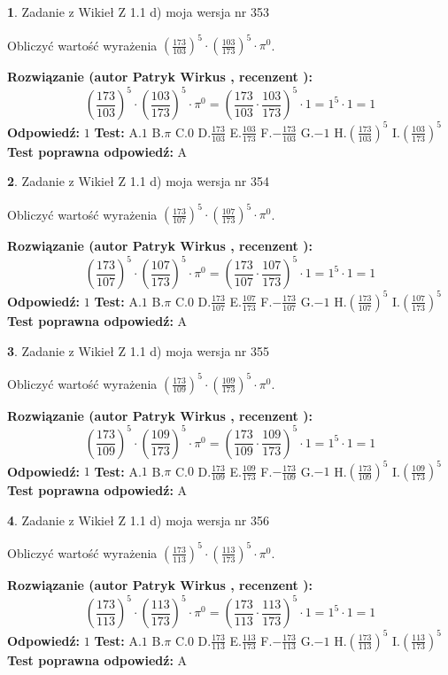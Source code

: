 \documentclass[12pt, a4paper]{article}
\theoremstyle{definition} %
\newtheorem{zad}{}
\newcommand{\zadStart}[1]{\begin{zad}#1\newline}
\newcommand{\zadStop}{\end{zad}}
\newcommand{\rozwStart}[2]{\noindent \textbf{Rozwiązanie (autor #1 , recenzent #2): }\newline}
\newcommand{\rozwStop}{\newline}
\newcommand{\odpStart}{\noindent \textbf{Odpowiedź:}\newline}
\newcommand{\odpStop}{\newline}
\newcommand{\testStart}{\noindent \textbf{Test:}\newline}
\newcommand{\testStop}{\newline}
\newcommand{\kluczStart}{\noindent \textbf{Test poprawna odpowiedź:}\newline}
\newcommand{\kluczStop}{\newline}
\begin{document}
\zadStart{Zadanie z Wikieł Z 1.1 d) moja wersja nr 353}

Obliczyć wartość wyrażenia $(\frac{173}{103})^{5} \cdot (\frac{103}{173})^{5} \cdot \pi^{0}$.
\zadStop
\rozwStart{Patryk Wirkus}{}
$$(\frac{173}{103})^{5} \cdot (\frac{103}{173})^{5} \cdot \pi^{0} = (\frac{173}{103} \cdot \frac{103}{173})^{5} \cdot 1 = 1^{5} \cdot 1 = 1$$
\rozwStop
\odpStart
$1$
\odpStop
\testStart
A.$1$ B.$\pi$ C.$0$ D.$\frac{173}{103}$ E.$\frac{103}{173}$
F.$-\frac{173}{103}$ G.$-1$
H.$(\frac{173}{103})^{5}$
I.$(\frac{103}{173})^{5}$
\testStop
\kluczStart
A
\kluczStop



\zadStart{Zadanie z Wikieł Z 1.1 d) moja wersja nr 354}

Obliczyć wartość wyrażenia $(\frac{173}{107})^{5} \cdot (\frac{107}{173})^{5} \cdot \pi^{0}$.
\zadStop
\rozwStart{Patryk Wirkus}{}
$$(\frac{173}{107})^{5} \cdot (\frac{107}{173})^{5} \cdot \pi^{0} = (\frac{173}{107} \cdot \frac{107}{173})^{5} \cdot 1 = 1^{5} \cdot 1 = 1$$
\rozwStop
\odpStart
$1$
\odpStop
\testStart
A.$1$ B.$\pi$ C.$0$ D.$\frac{173}{107}$ E.$\frac{107}{173}$
F.$-\frac{173}{107}$ G.$-1$
H.$(\frac{173}{107})^{5}$
I.$(\frac{107}{173})^{5}$
\testStop
\kluczStart
A
\kluczStop



\zadStart{Zadanie z Wikieł Z 1.1 d) moja wersja nr 355}

Obliczyć wartość wyrażenia $(\frac{173}{109})^{5} \cdot (\frac{109}{173})^{5} \cdot \pi^{0}$.
\zadStop
\rozwStart{Patryk Wirkus}{}
$$(\frac{173}{109})^{5} \cdot (\frac{109}{173})^{5} \cdot \pi^{0} = (\frac{173}{109} \cdot \frac{109}{173})^{5} \cdot 1 = 1^{5} \cdot 1 = 1$$
\rozwStop
\odpStart
$1$
\odpStop
\testStart
A.$1$ B.$\pi$ C.$0$ D.$\frac{173}{109}$ E.$\frac{109}{173}$
F.$-\frac{173}{109}$ G.$-1$
H.$(\frac{173}{109})^{5}$
I.$(\frac{109}{173})^{5}$
\testStop
\kluczStart
A
\kluczStop



\zadStart{Zadanie z Wikieł Z 1.1 d) moja wersja nr 356}

Obliczyć wartość wyrażenia $(\frac{173}{113})^{5} \cdot (\frac{113}{173})^{5} \cdot \pi^{0}$.
\zadStop
\rozwStart{Patryk Wirkus}{}
$$(\frac{173}{113})^{5} \cdot (\frac{113}{173})^{5} \cdot \pi^{0} = (\frac{173}{113} \cdot \frac{113}{173})^{5} \cdot 1 = 1^{5} \cdot 1 = 1$$
\rozwStop
\odpStart
$1$
\odpStop
\testStart
A.$1$ B.$\pi$ C.$0$ D.$\frac{173}{113}$ E.$\frac{113}{173}$
F.$-\frac{173}{113}$ G.$-1$
H.$(\frac{173}{113})^{5}$
I.$(\frac{113}{173})^{5}$
\testStop
\kluczStart
A
\kluczStop
\end{document}
